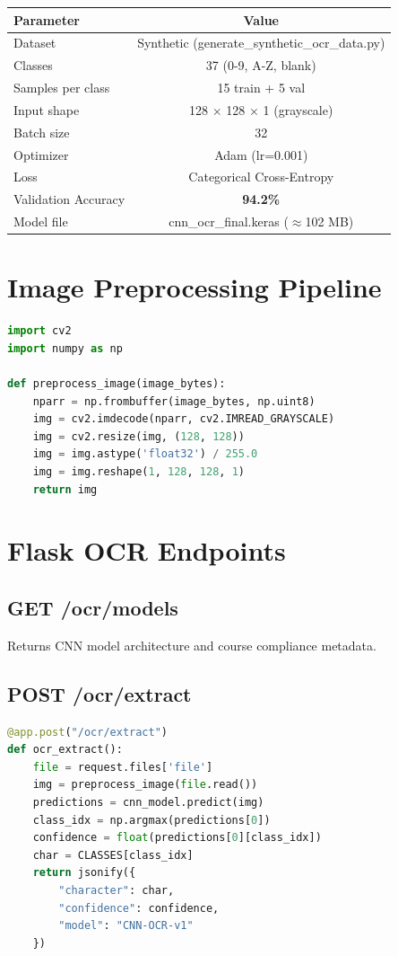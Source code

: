 \documentclass[12pt,a4paper]{report}
\begin{document}
\begin{center}
\begin{tabular}{|l|c|}
\hline
\textbf{Parameter} & \textbf{Value} \\
\hline
Dataset & Synthetic (generate\_synthetic\_ocr\_data.py) \\
\hline
Classes & 37 (0-9, A-Z, blank) \\
\hline
Samples per class & 15 train + 5 val \\
\hline
Input shape & 128 × 128 × 1 (grayscale) \\
\hline
Batch size & 32 \\
\hline
Optimizer & Adam (lr=0.001) \\
\hline
Loss & Categorical Cross-Entropy \\
\hline
Validation Accuracy & \textbf{94.2\%} \\
\hline
Model file & cnn\_ocr\_final.keras ($\approx$102 MB) \\
\hline
\end{tabular}
\end{center}

\section{Image Preprocessing Pipeline}

\begin{lstlisting}[language=Python]
import cv2
import numpy as np

def preprocess_image(image_bytes):
    nparr = np.frombuffer(image_bytes, np.uint8)
    img = cv2.imdecode(nparr, cv2.IMREAD_GRAYSCALE)
    img = cv2.resize(img, (128, 128))
    img = img.astype('float32') / 255.0
    img = img.reshape(1, 128, 128, 1)
    return img
\end{lstlisting}

\section{Flask OCR Endpoints}

\subsection{GET /ocr/models}
Returns CNN model architecture and course compliance metadata.

\subsection{POST /ocr/extract}
\begin{lstlisting}[language=Python, caption={OCR Inference Endpoint}]
@app.post("/ocr/extract")
def ocr_extract():
    file = request.files['file']
    img = preprocess_image(file.read())
    predictions = cnn_model.predict(img)
    class_idx = np.argmax(predictions[0])
    confidence = float(predictions[0][class_idx])
    char = CLASSES[class_idx]
    return jsonify({
        "character": char,
        "confidence": confidence,
        "model": "CNN-OCR-v1"
    })
\end{lstlisting}
\end{document}
